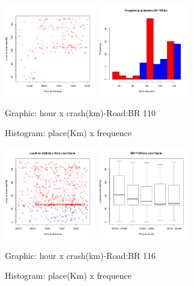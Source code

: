 \documentclass[conference,compsoc]{IEEEtran}
\begin{document}
\begin{figure}[ht]
\begin{center}
     \includegraphics[height=4.0cm]{graficos/br110_1.png}
     \includegraphics[height=4.0cm]{graficos/br110_3.png}
      \caption{Graphic: hour x crash(km)-Road:BR 110}
      \caption{Histogram: place(Km) x frequence}
\end{center}
\end{figure}

\begin{figure}[ht]
\begin{center}
     \includegraphics[height=4.0cm]{graficos/br116_1.png}
     \includegraphics[height=4.0cm]{graficos/br116_2.png}
      \caption{Graphic: hour x crash(km)-Road:BR 116}
      \caption{Histogram: place(Km) x frequence}
\end{center}
\end{figure}
\end{document}
